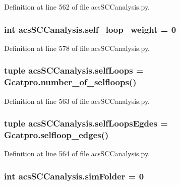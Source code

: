 Definition at line 562 of file acs\-S\-C\-Canalysis.\-py.

\hypertarget{a00102_ae9790fbc87f233c94224436a9cbd59c1}{
\subsubsection[{self\-\_\-loop\-\_\-weight}]{\setlength{\rightskip}{0pt plus 5cm}int acs\-S\-C\-Canalysis.\-self\-\_\-loop\-\_\-weight = 0}}\label{a00102_ae9790fbc87f233c94224436a9cbd59c1}


Definition at line 578 of file acs\-S\-C\-Canalysis.\-py.

\hypertarget{a00102_a8fec45ae9b70981ce94eaeed14d888b1}{
\subsubsection[{self\-Loops}]{\setlength{\rightskip}{0pt plus 5cm}tuple acs\-S\-C\-Canalysis.\-self\-Loops = Gcatpro.\-number\-\_\-of\-\_\-selfloops()}}\label{a00102_a8fec45ae9b70981ce94eaeed14d888b1}


Definition at line 563 of file acs\-S\-C\-Canalysis.\-py.

\hypertarget{a00102_ad34596e89eef2cfb696f61a810765c7a}{
\subsubsection[{self\-Loops\-Egdes}]{\setlength{\rightskip}{0pt plus 5cm}tuple acs\-S\-C\-Canalysis.\-self\-Loops\-Egdes = Gcatpro.\-selfloop\-\_\-edges()}}\label{a00102_ad34596e89eef2cfb696f61a810765c7a}


Definition at line 564 of file acs\-S\-C\-Canalysis.\-py.

\hypertarget{a00102_a58095f64afeda893517e81226e1963c3}{
\subsubsection[{sim\-Folder}]{\setlength{\rightskip}{0pt plus 5cm}int acs\-S\-C\-Canalysis.\-sim\-Folder = 0}}\label{a00102_a58095f64afeda893517e81226e1963c3}


